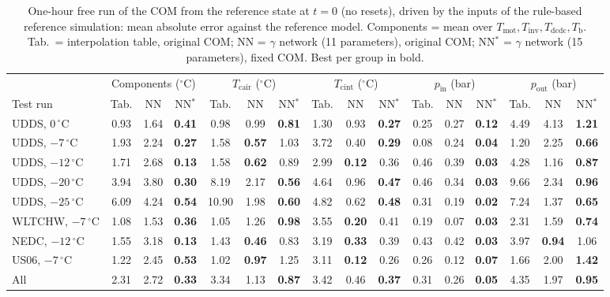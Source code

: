 \begin{table}[t]
\centering
\caption{One-hour free run of the COM from the reference state at $t=0$ (no resets), driven by the inputs of the rule-based reference simulation: mean absolute error against the reference model. Components = mean over $T_{\mathrm{mot}}, T_{\mathrm{inv}}, T_{\mathrm{dcdc}}, T_{\mathrm{b}}$. Tab.\ = interpolation table, original COM; NN = $\gamma$ network (11 parameters), original COM; NN$^{\ast}$ = $\gamma$ network (15 parameters), fixed COM. Best per group in bold.}
\label{tab:freerun}
\setlength{\tabcolsep}{3.5pt}
\begin{tabular}{l ccc ccc ccc ccc ccc}
\toprule
 & \multicolumn{3}{c}{Components ($^{\circ}$C)} & \multicolumn{3}{c}{$T_{\mathrm{cair}}$ ($^{\circ}$C)} & \multicolumn{3}{c}{$T_{\mathrm{cint}}$ ($^{\circ}$C)} & \multicolumn{3}{c}{$p_{\mathrm{in}}$ (bar)} & \multicolumn{3}{c}{$p_{\mathrm{out}}$ (bar)} \\
\cmidrule(lr){2-4}\cmidrule(lr){5-7}\cmidrule(lr){8-10}\cmidrule(lr){11-13}\cmidrule(lr){14-16}
Test run & Tab. & NN & NN$^{\ast}$ & Tab. & NN & NN$^{\ast}$ & Tab. & NN & NN$^{\ast}$ & Tab. & NN & NN$^{\ast}$ & Tab. & NN & NN$^{\ast}$ \\
\midrule
UDDS, $0\,^{\circ}$C & 0.93 & 1.64 & \textbf{0.41} & 0.98 & 0.99 & \textbf{0.81} & 1.30 & 0.93 & \textbf{0.27} & 0.25 & 0.27 & \textbf{0.12} & 4.49 & 4.13 & \textbf{1.21} \\
UDDS, $-7\,^{\circ}$C & 1.93 & 2.24 & \textbf{0.27} & 1.58 & \textbf{0.57} & 1.03 & 3.72 & 0.40 & \textbf{0.29} & 0.08 & 0.24 & \textbf{0.04} & 1.20 & 2.25 & \textbf{0.66} \\
UDDS, $-12\,^{\circ}$C & 1.71 & 2.68 & \textbf{0.13} & 1.58 & \textbf{0.62} & 0.89 & 2.99 & \textbf{0.12} & 0.36 & 0.46 & 0.39 & \textbf{0.03} & 4.28 & 1.16 & \textbf{0.87} \\
UDDS, $-20\,^{\circ}$C & 3.94 & 3.80 & \textbf{0.30} & 8.19 & 2.17 & \textbf{0.56} & 4.64 & 0.96 & \textbf{0.47} & 0.46 & 0.34 & \textbf{0.03} & 9.66 & 2.34 & \textbf{0.96} \\
UDDS, $-25\,^{\circ}$C & 6.09 & 4.24 & \textbf{0.54} & 10.90 & 1.98 & \textbf{0.60} & 4.82 & 0.62 & \textbf{0.48} & 0.31 & 0.19 & \textbf{0.02} & 7.24 & 1.37 & \textbf{0.65} \\
WLTCHW, $-7\,^{\circ}$C & 1.08 & 1.53 & \textbf{0.36} & 1.05 & 1.26 & \textbf{0.98} & 3.55 & \textbf{0.20} & 0.41 & 0.19 & 0.07 & \textbf{0.03} & 2.31 & 1.59 & \textbf{0.74} \\
NEDC, $-12\,^{\circ}$C & 1.55 & 3.18 & \textbf{0.13} & 1.43 & \textbf{0.46} & 0.83 & 3.19 & \textbf{0.33} & 0.39 & 0.43 & 0.42 & \textbf{0.03} & 3.97 & \textbf{0.94} & 1.06 \\
US06, $-7\,^{\circ}$C & 1.22 & 2.45 & \textbf{0.53} & 1.02 & \textbf{0.97} & 1.25 & 3.11 & \textbf{0.12} & 0.26 & 0.26 & 0.12 & \textbf{0.07} & 1.66 & 2.00 & \textbf{1.42} \\
\midrule
All & 2.31 & 2.72 & \textbf{0.33} & 3.34 & 1.13 & \textbf{0.87} & 3.42 & 0.46 & \textbf{0.37} & 0.31 & 0.26 & \textbf{0.05} & 4.35 & 1.97 & \textbf{0.95} \\
\bottomrule
\end{tabular}
\end{table}

